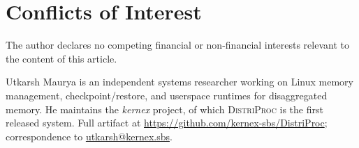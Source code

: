 \documentclass[journal]{IEEEtran}
\newif\ifanon
\newcommand{\distriproc}{\textsc{DistriProc}\xspace}
\begin{document}
\section*{Conflicts of Interest}

The author declares no competing financial or non-financial interests
relevant to the content of this article.
\fi

\newpage



\ifanon\else
\begin{IEEEbiographynophoto}{Utkarsh Maurya}
is an independent systems researcher working on Linux memory
management, checkpoint/restore, and userspace runtimes for
disaggregated memory. He maintains the \emph{kernex} project, of which
\distriproc is the first released system. Full artifact at
\url{https://github.com/kernex-sbs/DistriProc}; correspondence to
\href{mailto:utkarsh@kernex.sbs}{utkarsh@kernex.sbs}.
\end{IEEEbiographynophoto}
\fi
\end{document}
